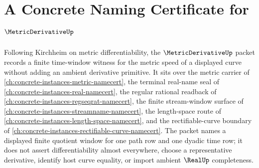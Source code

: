 \chapter{A Concrete Naming Certificate for $\MetricDerivativeUp$}
\label{ch:concrete-instances-metric-derivative-namecert}

Following Kirchheim on metric differentiability, the $\MetricDerivativeUp$ packet records a finite time-window witness for the metric speed of a displayed curve without adding an ambient derivative primitive. It sits over the metric carrier of \autoref{ch:concrete-instances-metric-namecert}, the terminal real-name seal of \autoref{ch:concrete-instances-real-namecert}, the regular rational readback of \autoref{ch:concrete-instances-regseqrat-namecert}, the finite stream-window surface of \autoref{ch:concrete-instances-streamname-namecert}, the length-space route of \autoref{ch:concrete-instances-length-space-namecert}, and the rectifiable-curve boundary of \autoref{ch:concrete-instances-rectifiable-curve-namecert}. The packet names a displayed finite quotient window for one path row and one dyadic time row; it does not assert differentiability almost everywhere, choose a representative derivative, identify host curve equality, or import ambient $\RealUp$ completeness.


